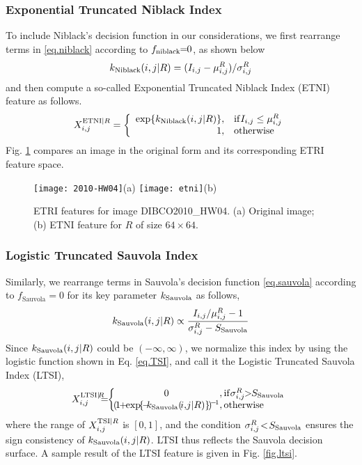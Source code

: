 \documentclass[onecolumn,11pt,draftcls,journal]{IEEEtran}
\def\fwI{.25}
\begin{document}
\subsubsection{Exponential Truncated Niblack Index}
To include Niblack's decision function in our considerations, we first rearrange terms in \eqref{eq.niblack} according to $f_{\rm niblack}\!\!=\!\!0$, as shown below
\begin{equation}
k_{\rm{Niblack}}(i,j|R)= (I_{i,j}-\mu_{i,j}^R)/\sigma_{i,j}^{R}
\end{equation} 
and then compute a so-called Exponential Truncated Niblack Index (ETNI) feature as follows.
\begin{equation}
X_{i,j}^{{\rm{ETNI}}|R} =\left\{
\begin{array}{rl}
\exp\{k_{\rm{Niblack}}(i,j|R)\},&{\rm if} I_{i,j}\leq\mu_{i,j}^R\\
1,&\rm otherwise
\end{array}
\right.
\label{eq.TNI}
\end{equation}
Fig. \ref{fig.etni} compares an image in the original form and its corresponding ETRI feature space. %

\begin{figure}[!h]
\centering\scriptsize
\texttt{[image: 2010-HW04]}{(a)}
\texttt{[image: etni]}{(b)}
\caption{ETRI features for image DIBCO2010\_HW04. (a) Original image; (b) ETNI feature for $R$ of size $64\times 64$. }\label{fig.etni}
\end{figure}

\subsubsection{ Logistic Truncated Sauvola Index}
Similarly, we rearrange terms in Sauvola's decision function \eqref{eq.sauvola} according to $f_{\textrm{Sauvola}}=0$ for its key parameter $k_{\rm{Sauvola}}$ as follows,
\begin{equation}
k_{\rm{Sauvola}}(i,j|R) \propto \displaystyle{I_{i,j}/\mu_{i,j}^R-1\over \sigma_{i,j}^{R}-S_{\rm{Sauvola}}}
\end{equation} 
Since $k_{\rm{Sauvola}}(i,j|R)$ could be $(-\infty,\infty)$, we normalize this index by using the logistic function shown in Eq. \eqref{eq.TSI}, and call it the Logistic Truncated Sauvola Index (LTSI),
\begin{equation}
X_{i,j}^{{\rm{LTSI}}|\!R} \!\!\!\!=\!\!
\left\{\!\!\!\!
\begin{array}{c@{}l}
0&,{\rm if} \sigma_{i,j}^{R}\!\!>\!\!S_{\rm{Sauvola}}\\
( \!1\!\!+\!\!\exp\!\{\!-\!\!k_{\rm{Sauvola}}(\!i,\!j|R)\}\!)\!^{\tiny{-\!1}}&,\rm otherwise
\end{array}
\right.
\label{eq.TSI}
\end{equation}
where the range of $X_{i,j}^{{\rm{TSI}}|R}$ is $[0\!,\!1]$, and the condition $\sigma_{i,j}^{R}\!<\!S_{\rm{Sauvola}}$ ensures the sign consistency of $k_{\rm{Sauvola}}(i,j|R)$. LTSI thus reflects the Sauvola decision surface. A sample result of the LTSI feature is given in Fig. \ref{fig.ltsi}.
\end{document}

